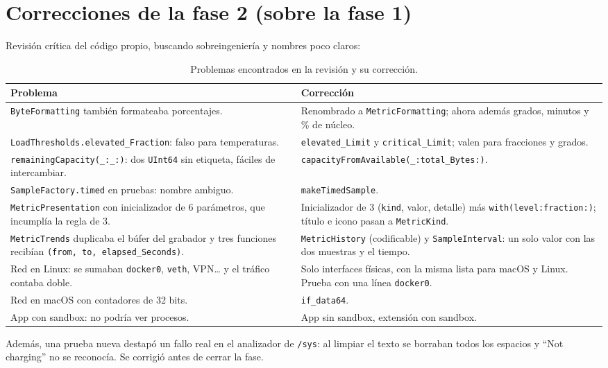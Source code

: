 \documentclass[11pt,a4paper]{article}
\begin{document}
\section{Correcciones de la fase 2 (sobre la fase 1)}\label{sec:correcciones}
Revisión crítica del código propio, buscando sobreingeniería y
nombres poco claros:
\begin{table}[H]
\centering
\begin{tabularx}{\textwidth}{@{}XX@{}}
\toprule
\textbf{Problema} & \textbf{Corrección}\\
\midrule
\texttt{ByteFormatting} también formateaba porcentajes. &
Renombrado a \texttt{MetricFormatting}; ahora además grados, minutos y
\% de núcleo.\\
\texttt{LoadThresholds.elevated\_Fraction}: falso para
temperaturas. & \texttt{elevated\_Limit} y \texttt{critical\_Limit};
valen para fracciones y grados.\\
\texttt{remainingCapacity(\_:\_:)}: dos \texttt{UInt64} sin
etiqueta, fáciles de intercambiar. &
\texttt{capacityFromAvailable(\_:total\_Bytes:)}.\\
\texttt{SampleFactory.timed} en pruebas: nombre ambiguo. &
\texttt{makeTimedSample}.\\
\texttt{MetricPresentation} con inicializador de 6 parámetros, que
incumplía la regla de 3. & Inicializador de 3 (\texttt{kind},
valor, detalle) más \texttt{with(level:fraction:)}; título e icono
pasan a \texttt{MetricKind}.\\
\texttt{MetricTrends} duplicaba el búfer del grabador y tres
funciones recibían \texttt{(from, to, elapsed\_Seconds)}. &
\texttt{MetricHistory} (codificable) y \texttt{SampleInterval}: un
solo valor con las dos muestras y el tiempo.\\
Red en Linux: se sumaban \texttt{docker0}, \texttt{veth}, VPN\ldots{}
y el tráfico contaba doble. & Solo interfaces físicas, con la misma
lista para macOS y Linux. Prueba con una línea \texttt{docker0}.\\
Red en macOS con contadores de 32 bits. & \texttt{if\_data64}.\\
App con sandbox: no podría ver procesos. & App sin sandbox,
extensión con sandbox.\\
\bottomrule
\end{tabularx}
\caption{Problemas encontrados en la revisión y su corrección.}
\end{table}
Además, una prueba nueva destapó un fallo real en el analizador de
\texttt{/sys}: al limpiar el texto se borraban todos los espacios y
``Not charging'' no se reconocía. Se corrigió antes de cerrar la fase.
\end{document}
